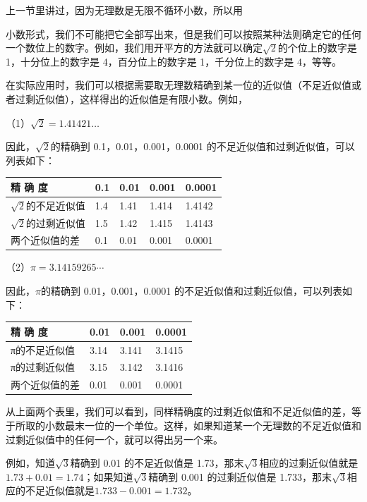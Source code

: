 上一节里讲过，因为无理数是无限不循环小数，所以用

小数形式，我们不可能把它全部写出来，但是我们可以按照某种法则确定它的任何一个数位上的数字。例如，我们用开平方的方法就可以确定\(\sqrt{2}\)的个位上的数字是
1，十分位上的数字是 4，百分位上的数字是 1，千分位上的数字是 4，等等。

在实际应用时，我们可以根据需要取无理数精确到某一位的近似值（不足近似值或者过剩近似值），这样得出的近似值是有限小数。例如，

（1）\(\sqrt{2} = 1.41421\dots\)

因此，\(\sqrt{2}\)的精确到 0.1，0.01，0.001，0.0001
的不足近似值和过剩近似值，可以列表如下：

{\def\LTcaptype{none} %
\begin{longtable}[]{@{}lllll@{}}
\toprule\noalign{}
精 确 度 & 0.1 & 0.01 & 0.001 & 0.0001 \\
\midrule\noalign{}
\endhead
\bottomrule\noalign{}
\endlastfoot
\(\sqrt{2}\)的不足近似值 & 1.4 & 1.41 & 1.414 & 1.4142 \\
\(\sqrt{2}\)的过剩近似值 & 1.5 & 1.42 & 1.415 & 1.4143 \\
两个近似值的差 & 0.1 & 0.01 & 0.001 & 0.0001 \\
\end{longtable}
}

（2）\(\pi = 3.14159265\cdots\)

因此，\(\pi\)的精确到 0.01，0.001，0.0001
的不足近似值和过剩近似值，可以列表如下：

{\def\LTcaptype{none} %
\begin{longtable}[]{@{}llll@{}}
\toprule\noalign{}
精 确 度 & 0.01 & 0.001 & 0.0001 \\
\midrule\noalign{}
\endhead
\bottomrule\noalign{}
\endlastfoot
π的不足近似值 & 3.14 & 3.141 & 3.1415 \\
π的过剩近似值 & 3.15 & 3.142 & 3.1416 \\
两个近似值的差 & 0.01 & 0.001 & 0.0001 \\
\end{longtable}
}

从上面两个表里，我们可以看到，同样精确度的过剩近似值和不足近似值的差，等于所取的小数最末一位的一个单位。这样，如果知道某一个无理数的不足近似值和过剩近似值中的任何一个，就可以得出另一个来。

例如，知道\(\sqrt{3}\)精确到 0.01 的不足近似值是
1.73，那末\(\sqrt{3}\)相应的过剩近似值就是\(1.73 + 0.01 = 1.74\)；如果知道\(\sqrt{3}\)精确到
0.001 的过剩近似值是
1.733，那末\(\sqrt{3}\)相应的不足近似值就是\(1.733 - 0.001 = 1.732\)。

